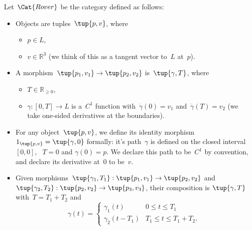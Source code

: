 \begin{definition}
Let~$\Cat{Rover}$ be the category defined as follows:

\begin{itemize}

\item Objects are tuples~$\tup{p, v}$, where
\begin{itemize}
\item $p \in L$,
\item $v \in \mathbb{R}^3$ (we think of this as a tangent vector to~$L$ at~$p$).  
\end{itemize}

\item A morphism~$\tup{p_1, v_1} \rightarrow \tup{p_2, v_2}$ is~$\tup{\gamma, T}$,
where
\begin{itemize}
\item $T \in \mathbb{R}_{\geq 0}$,
\item $\gamma \colon [0, T] \to L$ is a~$C^1$ function with~$\dot \gamma(0) = v_1$ and~$\dot \gamma(T) = v_2$  (we take one-sided derivatives at the boundaries). 
\end{itemize}

\item For any object~$\tup{p, v}$, we define its identity morphism~$1_{\tup{p,v}} = \tup{\gamma, 0}$ formally: it's path~$\gamma$ is defined on the closed interval~$[0,0]$, ~$T= 0$ and $\gamma(0) = p$. We declare this path to be~$C^1$ by convention, and declare its derivative at~$0$ to be~$v$.  

\item Given morphisms~$\tup{\gamma_1, T_1}: \tup{p_1, v_1} \to \tup{p_2, v_2}$ and~$\tup{\gamma_2, T_2}: \tup{p_2, v_2} \to \tup{p_3, v_3}$, their composition is $\tup{\gamma, T}$ with~$T = T_1 + T_2$ and
\begin{equation}
 \gamma(t) = \begin{cases}
 \gamma_1(t) &0 \leq t \leq T_1 \\
\gamma_2(t - T_1) & T_1 \leq t \leq T_1 + T_2.
 \end{cases}
\end{equation} 



\end{itemize}

\end{definition}




\


